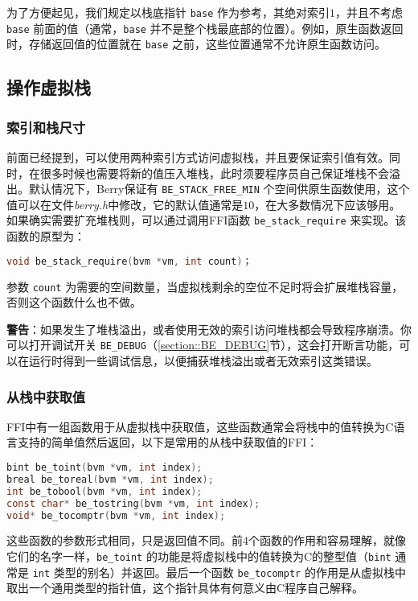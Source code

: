 为了方便起见，我们规定以栈底指针 \texttt{base} 作为参考，其绝对索引$1$，并且不考虑 \texttt{base} 前面的值（通常，\texttt{base} 并不是整个栈最底部的位置）。例如，原生函数返回时，存储返回值的位置就在 \texttt{base} 之前，这些位置通常不允许原生函数访问。

\subsection{操作虚拟栈}

\subsubsection{索引和栈尺寸}

前面已经提到，可以使用两种索引方式访问虚拟栈，并且要保证索引值有效。同时，在很多时候也需要将新的值压入堆栈，此时须要程序员自己保证堆栈不会溢出。默认情况下，Berry保证有 \texttt{BE\_STACK\_FREE\_MIN} 个空间供原生函数使用，这个值可以在文件\textsl{berry.h}中修改，它的默认值通常是$10$，在大多数情况下应该够用。如果确实需要扩充堆栈则，可以通过调用FFI函数 \texttt{be\_stack\_require} 来实现。该函数的原型为：
\begin{lstlisting}[language=c, style=berry, numbers=none]
void be_stack_require(bvm *vm, int count)；
\end{lstlisting}
参数 \texttt{count} 为需要的空间数量，当虚拟栈剩余的空位不足时将会扩展堆栈容量，否则这个函数什么也不做。

\textbf{警告}：如果发生了堆栈溢出，或者使用无效的索引访问堆栈都会导致程序崩溃。你可以打开调试开关 \texttt{BE\_DEBUG}（\ref{section::BE_DEBUG}节），这会打开断言功能，可以在运行时得到一些调试信息，以便捕获堆栈溢出或者无效索引这类错误。

\subsubsection{从栈中获取值}

FFI中有一组函数用于从虚拟栈中获取值，这些函数通常会将栈中的值转换为C语言支持的简单值然后返回，以下是常用的从栈中获取值的FFI：
\begin{lstlisting}[language=c, style=berry, numbers=none]
bint be_toint(bvm *vm, int index);
breal be_toreal(bvm *vm, int index);
int be_tobool(bvm *vm, int index);
const char* be_tostring(bvm *vm, int index);
void* be_tocomptr(bvm *vm, int index);
\end{lstlisting}
这些函数的参数形式相同，只是返回值不同。前4个函数的作用和容易理解，就像它们的名字一样，\texttt{be\_toint} 的功能是将虚拟栈中的值转换为C的整型值（\texttt{bint} 通常是 \texttt{int} 类型的别名）并返回。最后一个函数 \texttt{be\_tocomptr} 的作用是从虚拟栈中取出一个通用类型的指针值，这个指针具体有何意义由C程序自己解释。

